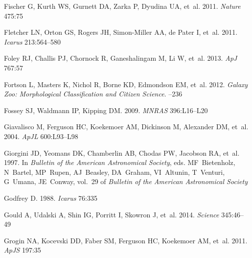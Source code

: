 \documentclass{ar2e}
\def\apj{ApJ}
\def\apjs{ApJS}
\def\apjl{ApJL}
\def\mnras{MNRAS}
\begin{document}
\begin{thebibliography}{}
{Fischer} G, {Kurth} WS, {Gurnett} DA, {Zarka} P, {Dyudina} UA, et~al. 2011.
\newblock \textit{{Nature}} 475:75

{Fletcher} LN, {Orton} GS, {Rogers} JH, {Simon-Miller} AA, {de Pater} I, et~al.
  2011.
\newblock \textit{Icarus} 213:564--580

{Foley} RJ, {Challis} PJ, {Chornock} R, {Ganeshalingam} M, {Li} W, et~al. 2013.
\newblock \textit{\apj} 767:57

{Fortson} L, {Masters} K, {Nichol} R, {Borne} KD, {Edmondson} EM, et~al. 2012.
\newblock \textit{{Galaxy Zoo: Morphological Classification and Citizen
  Science}}.
--236

{Fossey} SJ, {Waldmann} IP, {Kipping} DM. 2009.
\newblock \textit{\mnras} 396:L16--L20

{Giavalisco} M, {Ferguson} HC, {Koekemoer} AM, {Dickinson} M, {Alexander} DM,
  et~al. 2004.
\newblock \textit{\apjl} 600:L93--L98

{Giorgini} JD, {Yeomans} DK, {Chamberlin} AB, {Chodas} PW, {Jacobson} RA,
  et~al. 1997.
\newblock In \textit{Bulletin of the American Astronomical Society}, eds.
  MF~{Bietenholz}, N~{Bartel}, MP~{Rupen}, AJ~{Beasley}, DA~{Graham},
  VI~{Altunin}, T~{Venturi}, G~{Umana}, JE~{Conway}, vol.~29 of
  \textit{Bulletin of the American Astronomical Society}

{Godfrey} D. 1988.
\newblock \textit{{Icarus}} 76:335

{Gould} A, {Udalski} A, {Shin} IG, {Porritt} I, {Skowron} J, et~al. 2014.
\newblock \textit{Science} 345:46--49

{Grogin} NA, {Kocevski} DD, {Faber} SM, {Ferguson} HC, {Koekemoer} AM, et~al.
  2011.
\newblock \textit{\apjs} 197:35


\end{thebibliography}
\end{document}
